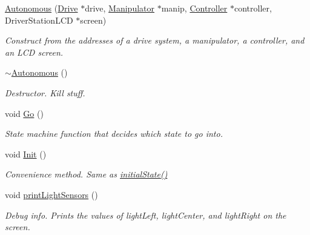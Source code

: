 \begin{DoxyCompactItemize}
\item 
\hyperlink{class_r_j_f_r_c2011_1_1_autonomous_a747bcf35b9790d7b69b14f4303496418}{Autonomous} (\hyperlink{class_r_j_f_r_c2011_1_1_drive}{Drive} $\ast$drive, \hyperlink{class_r_j_f_r_c2011_1_1_manipulator}{Manipulator} $\ast$manip, \hyperlink{class_r_j_f_r_c2011_1_1_controller}{Controller} $\ast$controller, DriverStationLCD $\ast$screen)
\begin{DoxyCompactList}\small\item\em Construct from the addresses of a drive system, a manipulator, a controller, and an LCD screen. \item\end{DoxyCompactList}\item 
\hypertarget{class_r_j_f_r_c2011_1_1_autonomous_a556fc6fc020f18c7bbe6cde03ef81ea4}{
\hyperlink{class_r_j_f_r_c2011_1_1_autonomous_a556fc6fc020f18c7bbe6cde03ef81ea4}{$\sim$Autonomous} ()}
\label{class_r_j_f_r_c2011_1_1_autonomous_a556fc6fc020f18c7bbe6cde03ef81ea4}

\begin{DoxyCompactList}\small\item\em Destructor. Kill stuff. \item\end{DoxyCompactList}\item 
void \hyperlink{class_r_j_f_r_c2011_1_1_autonomous_ab7959f947b71d84b03f53c8e91a542f6}{Go} ()
\begin{DoxyCompactList}\small\item\em State machine function that decides which state to go into. \item\end{DoxyCompactList}\item 
\hypertarget{class_r_j_f_r_c2011_1_1_autonomous_a8cae3af2e3d40459b013583ccec77da6}{
void \hyperlink{class_r_j_f_r_c2011_1_1_autonomous_a8cae3af2e3d40459b013583ccec77da6}{Init} ()}
\label{class_r_j_f_r_c2011_1_1_autonomous_a8cae3af2e3d40459b013583ccec77da6}

\begin{DoxyCompactList}\small\item\em Convenience method. Same as {\itshape \hyperlink{class_r_j_f_r_c2011_1_1_autonomous_a1f04427d07d9569a9f746445c82b8173}{initialState()}\/} \item\end{DoxyCompactList}\item 
\hypertarget{class_r_j_f_r_c2011_1_1_autonomous_ae35c0e29665ed5812645bec8acbbd965}{
void \hyperlink{class_r_j_f_r_c2011_1_1_autonomous_ae35c0e29665ed5812645bec8acbbd965}{printLightSensors} ()}
\label{class_r_j_f_r_c2011_1_1_autonomous_ae35c0e29665ed5812645bec8acbbd965}

\begin{DoxyCompactList}\small\item\em Debug info. Prints the values of lightLeft, lightCenter, and lightRight on the screen. \item\end{DoxyCompactList}\end{DoxyCompactItemize}
